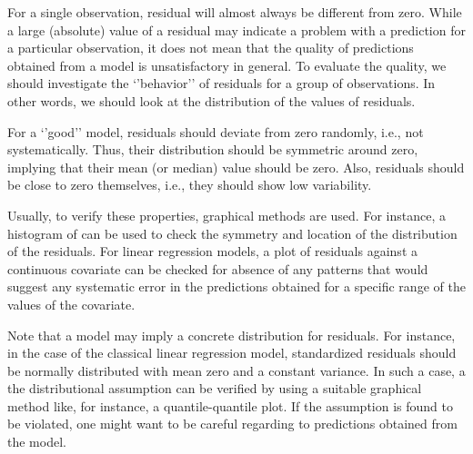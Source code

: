 \documentclass[]{krantz}
\begin{document}
For a single observation, residual will almost always be different from zero. While a large (absolute) value of a residual may indicate a problem with a prediction for a particular observation, it does not mean that the quality of predictions obtained from a model is unsatisfactory in general. To evaluate the quality, we should investigate the `'behavior'' of residuals for a group of observations. In other words, we should look at the distribution of the values of residuals.

For a `'good'' model, residuals should deviate from zero randomly, i.e., not systematically. Thus, their distribution should be symmetric around zero, implying that their mean (or median) value should be zero. Also, residuals should be close to zero themselves, i.e., they should show low variability.

Usually, to verify these properties, graphical methods are used. For instance, a histogram of can be used to check the symmetry and location of the distribution of the residuals. For linear regression models, a plot of residuals against a continuous covariate can be checked for absence of any patterns that would suggest any systematic error in the predictions obtained for a specific range of the values of the covariate.

Note that a model may imply a concrete distribution for residuals. For instance, in the case of the classical linear regression model, standardized residuals should be normally distributed with mean zero and a constant variance. In such a case, a the distributional assumption can be verified by using a suitable graphical method like, for instance, a quantile-quantile plot. If the assumption is found to be violated, one might want to be careful regarding to predictions obtained from the model.
\end{document}
